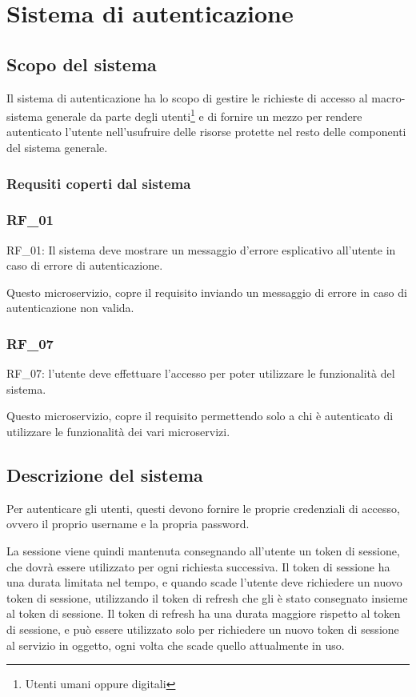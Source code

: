 \chapter{Sistema di autenticazione}


\section{Scopo del sistema}

Il sistema di autenticazione ha lo scopo di gestire le richieste di accesso al macro-sistema generale da parte degli utenti\footnote{Utenti umani oppure digitali} e di fornire un mezzo per rendere autenticato l'utente nell'usufruire delle risorse protette nel resto delle componenti del sistema generale.

\subsection{Requsiti coperti dal sistema}

\subsection{RF\_01}
RF\_01: Il sistema deve mostrare un messaggio d'errore esplicativo all'utente in caso di errore di autenticazione.

Questo microservizio, copre il requisito inviando un messaggio di errore in caso di autenticazione non valida.

\subsection{RF\_07}
RF\_07: l'utente deve effettuare l'accesso per poter utilizzare le funzionalità del sistema.

Questo microservizio, copre il requisito permettendo solo a chi è autenticato di utilizzare le funzionalità dei vari microservizi.


\section{Descrizione del sistema}

Per autenticare gli utenti, questi devono fornire le proprie credenziali di accesso, ovvero il proprio username e la propria password.

La sessione viene quindi mantenuta consegnando all'utente un token di sessione, che dovrà essere utilizzato per ogni richiesta successiva. Il token di sessione ha una durata limitata nel tempo, e quando scade l'utente deve richiedere un nuovo token di sessione, utilizzando il token di refresh che gli è stato consegnato insieme al token di sessione. Il token di refresh ha una durata maggiore rispetto al token di sessione, e può essere utilizzato solo per richiedere un nuovo token di sessione al servizio in oggetto, ogni volta che scade quello attualmente in uso.

